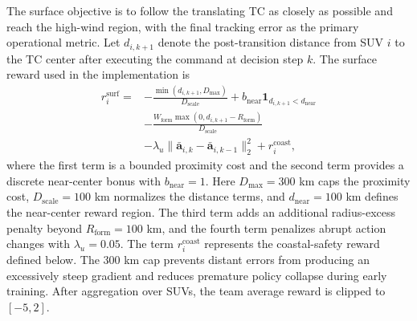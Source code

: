 \documentclass[a4paper,fleqn]{cas-dc}
\begin{document}
The surface objective is to follow the translating TC as closely as possible
and reach the high-wind region, with the final tracking error as the
primary operational metric. Let $d_{i,k+1}$ denote the post-transition
distance from SUV $i$ to the TC center after executing the command at decision
step $k$. The surface reward used in the implementation is
\begin{equation}
\begin{aligned}
r_i^{\mathrm{surf}}={}&
-\frac{\min(d_{i,k+1},D_{\max})}{D_{\mathrm{scale}}}
+b_{\mathrm{near}}\mathbf{1}_{d_{i,k+1}<d_{\mathrm{near}}}\\
&-\frac{W_{\mathrm{form}}
\max(0,d_{i,k+1}-R_{\mathrm{form}})}{D_{\mathrm{scale}}}\\
&-\lambda_u\|\bar{\mathbf{a}}_{i,k}
-\bar{\mathbf{a}}_{i,k-1}\|_2^2
+r_i^{\mathrm{coast}},
\end{aligned}
\label{eq:surface_reward}
\end{equation}
where the first term is a bounded proximity cost and the second term provides
a discrete near-center bonus with $b_{\mathrm{near}}=1$. Here
\(D_{\max}=300\) km caps the proximity cost, \(D_{\mathrm{scale}}=100\) km
normalizes the distance terms, and \(d_{\mathrm{near}}=100\) km defines the
near-center reward region. The third term adds an additional radius-excess
penalty beyond $R_{\mathrm{form}}=100$ km, and the fourth term penalizes abrupt
action changes with $\lambda_u=0.05$. The term $r_i^{\mathrm{coast}}$
represents the coastal-safety reward defined below. The 300 km cap prevents
distant errors from producing an excessively steep gradient and reduces
premature policy collapse during early training. After aggregation over SUVs,
the team average reward is clipped to $[-5,2]$.
\end{document}
